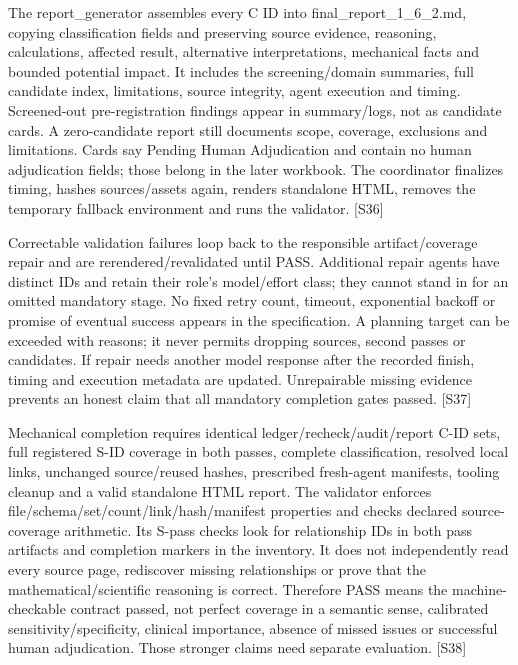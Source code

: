 \documentclass[10pt,a4paper]{article}
\begin{document}
The report\_\allowbreak{}generator assembles every C ID into final\_\allowbreak{}report\_\allowbreak{}1\_\allowbreak{}6\_\allowbreak{}2.\allowbreak{}md, copying classification fields and preserving source evidence, reasoning, calculations, affected result, alternative interpretations, mechanical facts and bounded potential impact.\allowbreak{} It includes the screening/\allowbreak{}domain summaries, full candidate index, limitations, source integrity, agent execution and timing.\allowbreak{} Screened-\allowbreak{}out pre-\allowbreak{}registration findings appear in summary/\allowbreak{}logs, not as candidate cards.\allowbreak{} A zero-\allowbreak{}candidate report still documents scope, coverage, exclusions and limitations.\allowbreak{} Cards say Pending Human Adjudication and contain no human adjudication fields; those belong in the later workbook.\allowbreak{} The coordinator finalizes timing, hashes sources/\allowbreak{}assets again, renders standalone HTML, removes the temporary fallback environment and runs the validator.\allowbreak{} [S36]\par
Correctable validation failures loop back to the responsible artifact/\allowbreak{}coverage repair and are rerendered/\allowbreak{}revalidated until PASS.\allowbreak{} Additional repair agents have distinct IDs and retain their role's model/\allowbreak{}effort class; they cannot stand in for an omitted mandatory stage.\allowbreak{} No fixed retry count, timeout, exponential backoff or promise of eventual success appears in the specification.\allowbreak{} A planning target can be exceeded with reasons; it never permits dropping sources, second passes or candidates.\allowbreak{} If repair needs another model response after the recorded finish, timing and execution metadata are updated.\allowbreak{} Unrepairable missing evidence prevents an honest claim that all mandatory completion gates passed.\allowbreak{} [S37]\par
Mechanical completion requires identical ledger/\allowbreak{}recheck/\allowbreak{}audit/\allowbreak{}report C-\allowbreak{}ID sets, full registered S-\allowbreak{}ID coverage in both passes, complete classification, resolved local links, unchanged source/\allowbreak{}reused hashes, prescribed fresh-\allowbreak{}agent manifests, tooling cleanup and a valid standalone HTML report.\allowbreak{} The validator enforces file/\allowbreak{}schema/\allowbreak{}set/\allowbreak{}count/\allowbreak{}link/\allowbreak{}hash/\allowbreak{}manifest properties and checks declared source-\allowbreak{}coverage arithmetic.\allowbreak{} Its S-\allowbreak{}pass checks look for relationship IDs in both pass artifacts and completion markers in the inventory.\allowbreak{} It does not independently read every source page, rediscover missing relationships or prove that the mathematical/\allowbreak{}scientific reasoning is correct.\allowbreak{} Therefore PASS means the machine-\allowbreak{}checkable contract passed, not perfect coverage in a semantic sense, calibrated sensitivity/\allowbreak{}specificity, clinical importance, absence of missed issues or successful human adjudication.\allowbreak{} Those stronger claims need separate evaluation.\allowbreak{} [S38]\par
\end{document}
